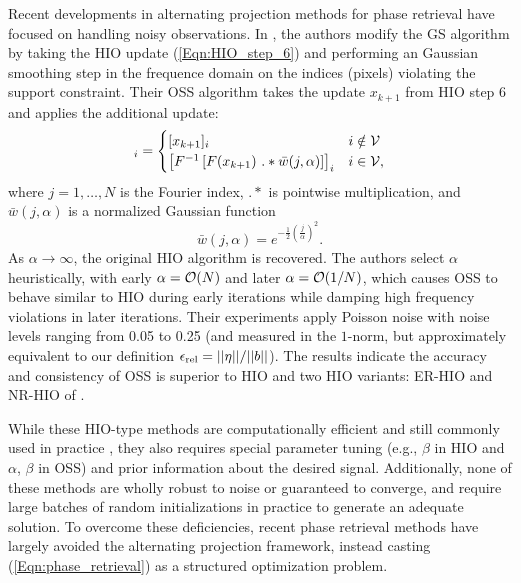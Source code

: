 Recent developments in alternating projection methods for phase retrieval have focused on handling noisy observations.  In \cite{rodriguez2013oversampling}, the authors modify the GS algorithm by taking the HIO update (\ref{Eqn:HIO_step_6}) and performing an Gaussian smoothing step in the frequence domain on the indices (pixels) violating the support constraint.  Their OSS algorithm takes the update $x_{k+1}$ from HIO step 6 and applies the additional update:
\begin{equation}
[x'_{k+1}]_i =
	\begin{cases}
		[x_{k+1}]_i		&	i \notin \caV		\\
		\left[ F^{ -1} \left[ F ( x_{k+1}) \ .* \bar{w}(j, \alpha) \right]  \right]_i	&	 i \in \caV,
	\end{cases}
\end{equation}
where $j = 1, \ldots, N$ is the Fourier index, $.*$ is pointwise multiplication, and $\bar{w}(j, \alpha)$ is a normalized Gaussian function
\[
\bar{w}(j, \alpha) = e^ {- \frac{1}{2} \left(\frac{j}{\alpha} \right)^2}.
\]
As $\alpha \rightarrow \infty$, the original HIO algorithm is recovered.  The authors select $\alpha$ heuristically, with early $\alpha = {\mathcal O}(N)$ and later $\alpha = {\mathcal O}(1/N)$, which causes OSS to behave similar to HIO during early iterations while damping high frequency violations in later iterations.  Their experiments \cite[Section 3]{rodriguez2013oversampling} apply Poisson noise with noise levels ranging from 0.05 to 0.25 (and measured in the $1$-norm, but approximately equivalent to our definition $\epsilon_\textnormal{rel} = ||\eta|| / ||b||$).  The results indicate the accuracy and consistency of OSS is superior to HIO and two HIO variants: ER-HIO and NR-HIO of \cite{martin2012noise}.  







While these HIO-type methods are computationally efficient and still commonly used in practice \cite{DBLP:journals/corr/JaganathanEH15a}, they also requires special parameter tuning (e.g., $\beta$ in HIO and $\alpha$, $\beta$ in OSS) and prior information about the desired signal.  Additionally, none of these methods are wholly robust to noise or guaranteed to converge, and require large batches of random initializations in practice to generate an adequate solution.  To overcome these deficiencies, recent phase retrieval methods have largely avoided the alternating projection framework, instead casting (\ref{Eqn:phase_retrieval}) as a structured optimization problem.





